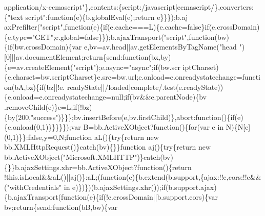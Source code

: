 \begin{DoxyCode}
{       application/x-ecmascript"\},contents:\{script:/javascript|ecmascript/\},converters:\{"text script":function(e)\{b.globalEval(e);return
       e\}\}\});b.aj
      axPrefilter("script",function(e)\{if(e.cache===L)\{e.cache=false\}if(e.crossDomain)\{e.type="GET";e.global=false\}\});b.ajaxTransport("script",function(bw)\{if(bw.crossDomain)\{var
       e,bv=av.head||av.getElementsByTagName("head
      ")[0]||av.documentElement;return\{send:function(bx,by)\{e=av.createElement("script");e.async="async";if(bw.scr
      iptCharset)\{e.charset=bw.scriptCharset\}e.src=bw.url;e.onload=e.onreadystatechange=function(bA,bz)\{if(bz||!e.
      readyState||/loaded|complete/.test(e.readyState))\{e.onload=e.onreadystatechange=null;if(bv&&e.parentNode)\{bv
      .removeChild(e)\}e=L;if(!bz)\{by(200,"success")\}\}\};bv.insertBefore(e,bv.firstChild)\},abort:function()\{if(e)\{e.onload(0,1)\}\}\}\}\});var B=bb.ActiveXObject?function()\{for(var e in N)\{N[e](0,1)\}\}:false,y=0,N;function
       aL()\{try\{return new bb.XMLHttpRequest()\}catch(bv)\{\}\}function aj()\{try\{return new
       bb.ActiveXObject("Microsoft.XMLHTTP")\}catch(bv)\{\}\}b.ajaxSettings.xhr=bb.ActiveXObject?function()\{return
       !this.isLocal&&aL()||aj()\}:aL;(function(e)\{b.extend(b.support,\{ajax:!!e,cors:!!e&&("withCredentials" in
       e)\})\})(b.ajaxSettings.xhr());if(b.support.ajax)\{b.ajaxTransport(function(e)\{if(!e.crossDomain||b.support.cors)\{var bv;return\{send:function(bB,bw)\{var
       
}
\end{DoxyCode}
